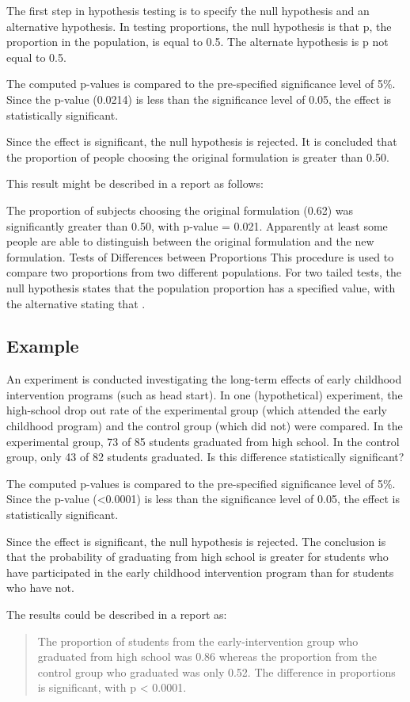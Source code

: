 The first step in hypothesis testing is to specify the null hypothesis and an alternative hypothesis. In testing proportions, the null hypothesis is that p, the proportion in the population, is equal to 0.5. The alternate hypothesis is p not equal to 0.5.

The computed p-values is compared to the pre-specified significance level of 5\%. Since the p-value (0.0214) is less than the significance level of 0.05, the effect is statistically significant.

Since the effect is significant, the null hypothesis is rejected. It is concluded that the proportion of people choosing the original formulation is greater than 0.50.

This result might be described in a report as follows:

    The proportion of subjects choosing the original formulation (0.62) was significantly greater than 0.50, with p-value = 0.021.
    Apparently at least some people are able to distinguish between the original formulation and the new formulation.
Tests of Differences between Proportions
This procedure is used to compare two proportions from two different populations. For two tailed tests, the null hypothesis states that the population proportion  has a specified value, with the alternative stating that .

\subsection{Example}
An experiment is conducted investigating the long-term effects of early childhood intervention programs (such as head start). In one (hypothetical) experiment, the high-school drop out rate of the experimental group (which attended the early childhood program) and the control group (which did not) were compared. In the experimental group, 73 of 85 students graduated from high school. In the control group, only 43 of 82 students graduated. Is this difference statistically significant?

The computed p-values is compared to the pre-specified significance level of 5\%. Since the p-value (<0.0001) is less than the significance level of 0.05, the effect is statistically significant.

Since the effect is significant, the null hypothesis is rejected. The conclusion is that the probability of graduating from high school is greater for students who have participated in the early childhood intervention program than for students who have not.

The results could be described in a report as:
\begin{quote}
The proportion of students from the early-intervention group who graduated from high school was 0.86 whereas the proportion from the control group who graduated was only 0.52. The difference in proportions is significant, with p < 0.0001.
\end{quote}
